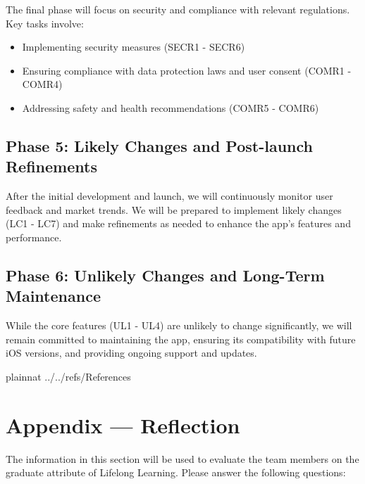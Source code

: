 \documentclass[12pt]{article}
\begin{document}
The final phase will focus on security and compliance with relevant regulations. Key tasks involve:

\begin{itemize}
\item Implementing security measures (SECR1 - SECR6)
\item Ensuring compliance with data protection laws and user consent (COMR1 - COMR4)
\item Addressing safety and health recommendations (COMR5 - COMR6)
\end{itemize}

\subsection{Phase 5: Likely Changes and Post-launch Refinements}

After the initial development and launch, we will continuously monitor user feedback and market trends. We will be prepared to implement likely changes (LC1 - LC7) and make refinements as needed to enhance the app's features and performance.

\subsection{Phase 6: Unlikely Changes and Long-Term Maintenance}

While the core features (UL1 - UL4) are unlikely to change significantly, we will remain committed to maintaining the app, ensuring its compatibility with future iOS versions, and providing ongoing support and updates. 


\newpage

 {plainnat}
 {../../refs/References}



\newpage{}
\section*{Appendix --- Reflection}

The information in this section will be used to evaluate the team members on the
graduate attribute of Lifelong Learning.  Please answer the following questions:
\end{document}
